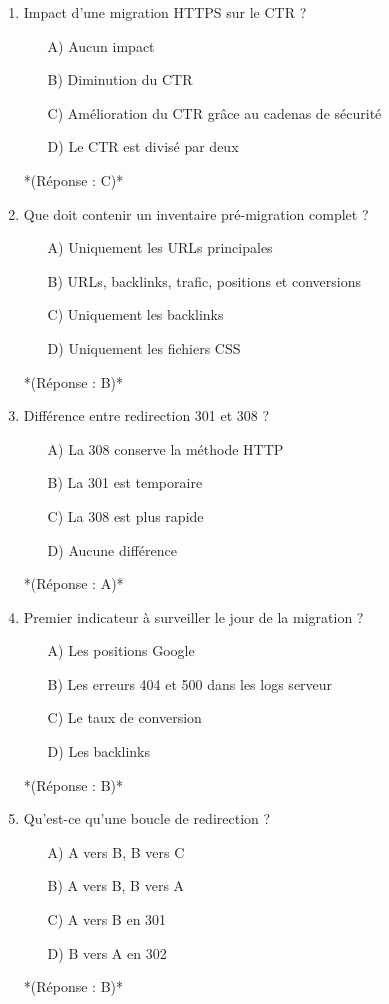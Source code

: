 \documentclass[12pt,a4paper,twoside]{report}
\begin{document}
\begin{enumerate}
\item Impact d'une migration HTTPS sur le CTR ?
\begin{itemize}
\item[A)] Aucun impact
\item[B)] Diminution du CTR
\item[C)] Amélioration du CTR grâce au cadenas de sécurité
\item[D)] Le CTR est divisé par deux
\end{itemize}
*(Réponse : C)*

\item Que doit contenir un inventaire pré-migration complet ?
\begin{itemize}
\item[A)] Uniquement les URLs principales
\item[B)] URLs, backlinks, trafic, positions et conversions
\item[C)] Uniquement les backlinks
\item[D)] Uniquement les fichiers CSS
\end{itemize}
*(Réponse : B)*

\item Différence entre redirection 301 et 308 ?
\begin{itemize}
\item[A)] La 308 conserve la méthode HTTP
\item[B)] La 301 est temporaire
\item[C)] La 308 est plus rapide
\item[D)] Aucune différence
\end{itemize}
*(Réponse : A)*

\item Premier indicateur à surveiller le jour de la migration ?
\begin{itemize}
\item[A)] Les positions Google
\item[B)] Les erreurs 404 et 500 dans les logs serveur
\item[C)] Le taux de conversion
\item[D)] Les backlinks
\end{itemize}
*(Réponse : B)*

\item Qu'est-ce qu'une boucle de redirection ?
\begin{itemize}
\item[A)] A vers B, B vers C
\item[B)] A vers B, B vers A
\item[C)] A vers B en 301
\item[D)] B vers A en 302
\end{itemize}
*(Réponse : B)*


\end{enumerate}
\end{document}
